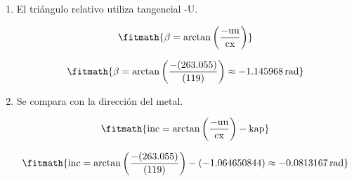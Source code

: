 \begin{enumerate}

\item El triángulo relativo utiliza tangencial -U.

\[\fitmath{\beta=\arctan\left(\frac{-\mathrm{uu}}{\mathrm{cx}}\right)}\]

\[\fitmath{\beta=\arctan\left(\frac{-(263.055)}{(119)}\right)\approx -1.145968\,\mathrm{rad}}\]

\item Se compara con la dirección del metal.

\[\fitmath{\mathrm{inc}=\arctan\left(\frac{-\mathrm{uu}}{\mathrm{cx}}\right)-\mathrm{kap}}\]

\[\fitmath{\mathrm{inc}=\arctan\left(\frac{-(263.055)}{(119)}\right)-(-1.064650844)\approx -0.0813167\,\mathrm{rad}}\]

\end{enumerate}
